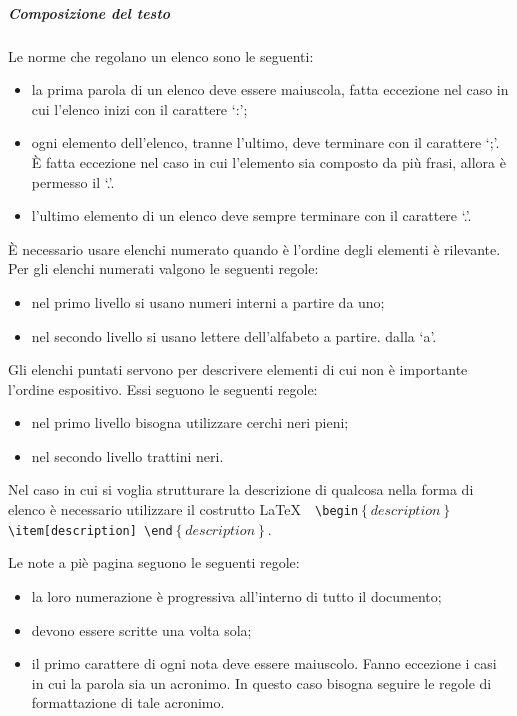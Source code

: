 \documentclass[../NormeProgetto.tex]{subfiles}
\begin{document}
		\subparagraph{Composizione del testo}
			Le norme che regolano un elenco sono le seguenti:
			\begin{itemize}
				\item la prima parola di un elenco deve essere maiuscola, fatta eccezione nel caso in cui l'elenco inizi con il carattere `:';
				\item ogni elemento dell'elenco, tranne l'ultimo, deve terminare con il carattere `;'. È fatta eccezione nel caso in cui l'elemento sia composto da più frasi, allora è permesso il `.'.
				\item l'ultimo elemento di un elenco deve sempre terminare con il carattere `.'.
			\end{itemize}
È necessario usare elenchi numerato quando è l'ordine degli elementi è rilevante. Per gli elenchi numerati valgono le seguenti regole:
			\begin{itemize}
				\item nel primo livello si usano numeri interni a partire da uno;
				\item nel secondo livello si usano lettere dell'alfabeto a partire. dalla `a'.
			\end{itemize}
Gli elenchi puntati servono per descrivere elementi di cui non è importante l'ordine espositivo. Essi seguono le seguenti regole:
			\begin{itemize}
				\item nel primo livello bisogna utilizzare cerchi neri pieni;
				\item nel secondo livello trattini neri.
			\end{itemize}
			
			
			Nel caso in cui si voglia strutturare la descrizione di qualcosa nella forma di elenco è necessario utilizzare il costrutto \LaTeX\ \texttt{ \textbackslash begin$\left\{description\right\}$ \textbackslash item[description] \textbackslash end$\left\{description\right\}$}.			
			
			Le note a piè pagina seguono le seguenti regole:
			\begin{itemize}
				\item la loro numerazione è progressiva all'interno di tutto il documento;
				\item devono essere scritte una volta sola;
				\item il primo carattere di ogni nota deve essere maiuscolo. Fanno eccezione i casi in cui la parola sia un acronimo. In questo caso bisogna seguire le regole di formattazione di tale acronimo.
			\end{itemize}
			
\end{document}
